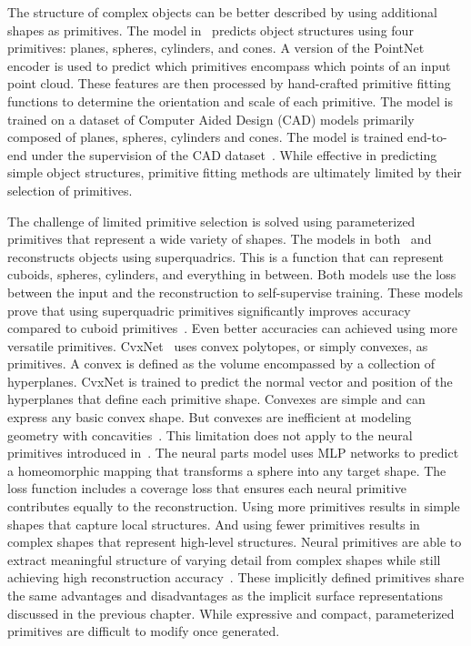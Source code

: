 The structure of complex objects can be better described by using additional shapes as primitives. The model in~\cite{Li2019} predicts object structures using four primitives: planes, spheres, cylinders, and cones. A version of the PointNet encoder is used to predict which primitives encompass which points of an input point cloud. These features are then processed by hand-crafted primitive fitting functions to determine the orientation and scale of each primitive. The model is trained on a dataset of Computer Aided Design (CAD) models primarily composed of planes, spheres, cylinders and cones. The model is trained end-to-end under the supervision of the CAD dataset~\cite{Li2019}. While effective in predicting simple object structures, primitive fitting methods are ultimately limited by their selection of primitives.

The challenge of limited primitive selection is solved using parameterized primitives that represent a wide variety of shapes. The models in both~\cite{Paschalidou2019} and~\cite{Paschalidou2020} reconstructs objects using superquadrics. This is a function that can represent cuboids, spheres, cylinders, and everything in between. Both models use the loss between the input and the reconstruction to self-supervise training. These models prove that using superquadric primitives significantly improves accuracy compared to cuboid primitives~\cite{Paschalidou2019}. Even better accuracies can achieved using more versatile primitives. CvxNet~\cite{Deng2020} uses convex polytopes, or simply convexes, as primitives. A convex is defined as the volume encompassed by a collection of hyperplanes. CvxNet is trained to predict the normal vector and position of the hyperplanes that define each primitive shape. Convexes are simple and can express any basic convex shape. But convexes are inefficient at modeling geometry with concavities~\cite{Deng2020}. This limitation does not apply to the neural primitives introduced in~\cite{Paschalidou2021}. The neural parts model uses MLP networks to predict a homeomorphic mapping that transforms a sphere into any target shape. The loss function includes a coverage loss that ensures each neural primitive contributes equally to the reconstruction. Using more primitives results in simple shapes that capture local structures. And using fewer primitives results in complex shapes that represent high-level structures. Neural primitives are able to extract meaningful structure of varying detail from complex shapes while still achieving high reconstruction accuracy~\cite{Paschalidou2021}. These implicitly defined primitives share the same advantages and disadvantages as the implicit surface representations discussed in the previous chapter. While expressive and compact, parameterized primitives are difficult to modify once generated.

